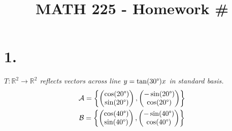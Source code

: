 \documentclass[12pt]{article}
\title{\vspace{-2\baselineskip}MATH 225 - Homework \#\HOMEWORKNUM}
\author{\NAME}
\date{\DATE}
\begin{document}
\maketitle

\section*{1.}
\textit{$T: \mathbb{R}^2 \rightarrow \mathbb{R}^2$ reflects vectors across
line $y = \tan(30 \degree)x$ in standard basis.}
\begin{gather*}
	\mathcal{A}
	=
	\left\{
		\begin{pmatrix} \cos(20 \degree) \\ \sin(20 \degree) \end{pmatrix},
		\begin{pmatrix} -\sin(20 \degree) \\ \cos(20 \degree) \end{pmatrix}
	\right\}
	\\
	\mathcal{B}
	=
	\left\{
		\begin{pmatrix} \cos(40 \degree) \\ \sin(40 \degree) \end{pmatrix},
		\begin{pmatrix} -\sin(40 \degree) \\ \cos(40 \degree) \end{pmatrix}
	\right\}
\end{gather*}
\end{document}
